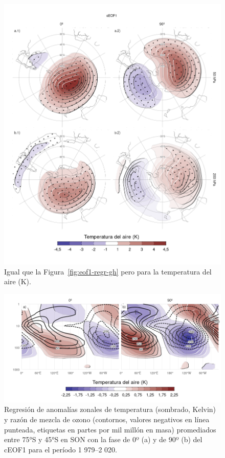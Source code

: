\documentclass[12pt,oneside,a4paper]{reedthesis}
\begin{document}
\begin{figure}

{\centering \includegraphics{figures/20-ceofs/eof1-regr-t-1} 

}

\caption{Igual que la Figura~\ref{fig:eof1-regr-gh} pero para la temperatura del aire (K).}\label{fig:eof1-regr-t}
\end{figure}



\begin{figure}

{\centering \includegraphics{figures/20-ceofs/t-vertical-1} 

}

\caption{Regresión de anomalías zonales de temperatura (sombrado, Kelvin) y razón de mezcla de ozono (contornos, valores negativos en línea punteada, etiquetas en partes por mil millón en masa) promediados entre 75°S y 45°S en SON con la fase de 0º (a) y de 90º (b) del cEOF1 para el período 1 979--2 020.}\label{fig:t-vertical}
\end{figure}
\end{document}
